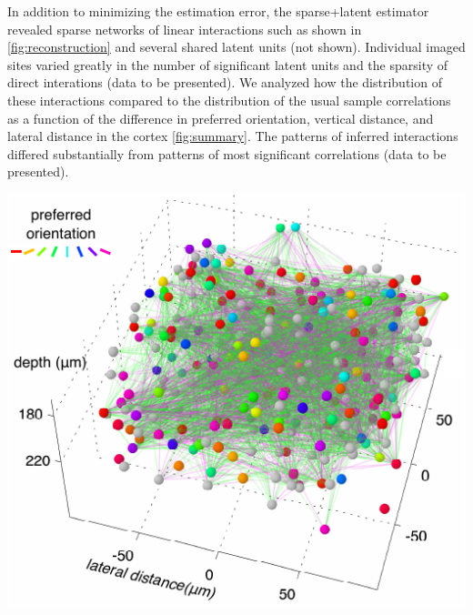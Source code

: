 \documentclass[12pt]{amsart}
\newenvironment{Figure}
  {\par\medskip\noindent\minipage{\linewidth}}
  {\endminipage\par\medskip}
\begin{document}
In addition to minimizing the estimation error, the sparse+latent estimator revealed sparse networks of linear interactions such as shown in \autoref{fig:reconstruction} and several shared latent units (not shown).
Individual imaged sites varied greatly in the number of significant latent units and the sparsity of direct interations (data to be presented).
We analyzed how the distribution of these interactions compared to the distribution of the usual sample correlations as a function of the difference in preferred orientation, vertical distance, and lateral distance in the cortex \autoref{fig:summary}. The patterns of inferred interactions differed substantially from patterns of most significant correlations (data to be presented).
\begin{multicols}{2}
\begin{Figure}
  \includegraphics{./Reconstruction.pdf}
  \label{fig:reconstruction}
\end{Figure}


\end{multicols}
\end{document}
